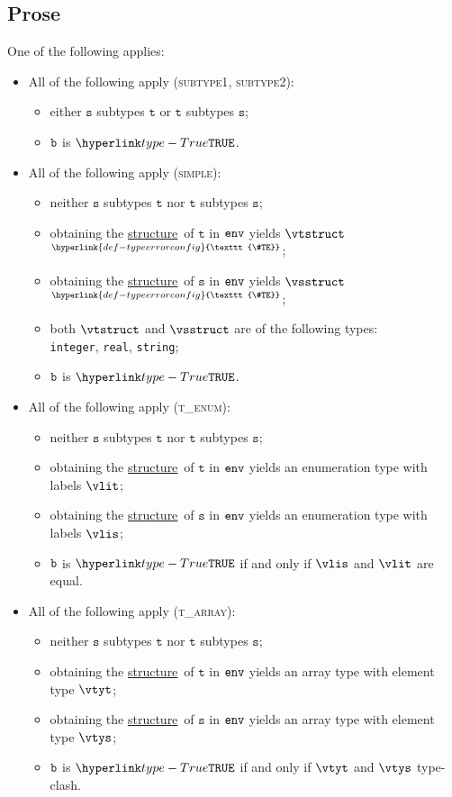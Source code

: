 \documentclass{book}
\newcommand\TypeErrorConfig[0]{\hyperlink{def-typeerrorconfig}{\texttt{\#TE}}}
\newcommand\ProseOrTypeError[0]{\hyperlink{def-proseortypeerror}{$^{\TypeErrorConfig}$}}
\newcommand\structure[0]{\hyperlink{def-structure}{structure}}
\newcommand\vt[0]{\texttt{t}}
\newcommand\vs[0]{\texttt{s}}
\begin{document}
\subsection{Prose}
 One of the following applies:
\begin{itemize}
  \item All of the following apply (\textsc{subtype1}, \textsc{subtype2}):
  \begin{itemize}
    \item either $\vs$ subtypes $\vt$ or $\vt$ subtypes $\vs$;
    \item $\texttt{b}$ is $\True$.
  \end{itemize}

  \item All of the following apply (\textsc{simple}):
  \begin{itemize}
    \item neither $\vs$ subtypes $\vt$ nor $\vt$ subtypes $\vs$;
    \item obtaining the \structure\ of $\vt$ in $\texttt{env}$ yields $\vtstruct$ \ProseOrTypeError;
    \item obtaining the \structure\ of $\vs$ in $\texttt{env}$ yields $\vsstruct$ \ProseOrTypeError;
    \item both $\vtstruct$ and $\vsstruct$ are of the following types: \\ \texttt{integer}, \texttt{real}, \texttt{string};
    \item $\texttt{b}$ is $\True$.
  \end{itemize}

  \item All of the following apply (\textsc{t\_enum}):
  \begin{itemize}
    \item neither $\vs$ subtypes $\vt$ nor $\vt$ subtypes $\vs$;
    \item obtaining the \structure\ of $\vt$ in $\texttt{env}$ yields an enumeration type with labels $\vlit$;
    \item obtaining the \structure\ of $\vs$ in $\texttt{env}$ yields an enumeration type with labels $\vlis$;
    \item $\texttt{b}$ is $\True$ if and only if $\vlis$ and $\vlit$ are equal.
  \end{itemize}

  \item All of the following apply (\textsc{t\_array}):
  \begin{itemize}
    \item neither $\vs$ subtypes $\vt$ nor $\vt$ subtypes $\vs$;
    \item obtaining the \structure\ of $\vt$ in $\texttt{env}$ yields an array type with element type $\vtyt$;
    \item obtaining the \structure\ of $\vs$ in $\texttt{env}$ yields an array type with element type $\vtys$;
    \item $\texttt{b}$ is $\True$ if and only if $\vtyt$ and $\vtys$ type-clash.
  \end{itemize}


\end{itemize}
\end{document}
